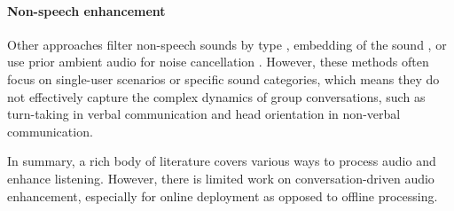 \paragraph{Non-speech enhancement}
Other approaches filter non-speech sounds by type \cite{veluri2023semantic}, embedding of the sound \cite{liu22w_interspeech}, or use prior ambient audio for noise cancellation \cite{shen2018mute}. 
However, these methods often focus on single-user scenarios or specific sound categories, which means they do not effectively capture the complex dynamics of group conversations, such as turn-taking in verbal communication and head orientation in non-verbal communication. 

In summary, a rich body of literature covers various ways to process audio and enhance listening. However, there is limited work on conversation-driven audio enhancement, especially for online deployment as opposed to offline processing.






